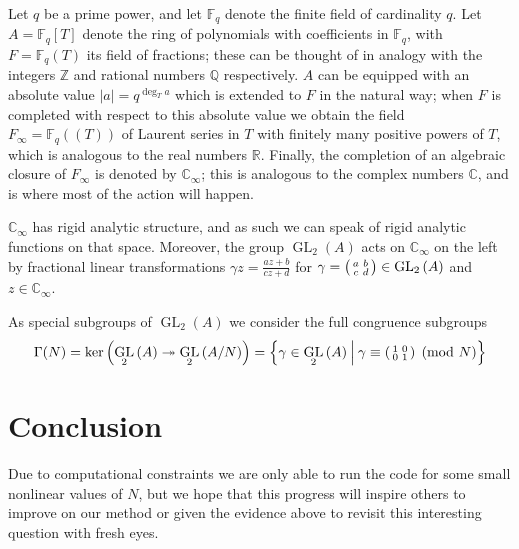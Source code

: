 \documentclass{article}
\newcommand*{\ZZ}{\mathbb{Z}}
\newcommand*{\QQ}{\mathbb{Q}}
\newcommand*{\RR}{\mathbb{R}}
\newcommand*{\CC}{\mathbb{C}}
\newcommand*{\CCi}{\mathbb{C}_\infty}
\newcommand*{\FF}{\mathbb{F}}
\newcommand*{\onto}{\twoheadrightarrow}
\DeclareMathOperator{\GLL}{GL}
\newcommand*{\GL}[2][]{\GLL_{#1}\parens{#2}}
\newcommand*{\setst}[2]{\left\{#1\:\middle|\:#2\right\}}
\newcommand*{\abs}[1]{\left\lvert#1\right\rvert}
\newcommand*{\parens}[1]{\left(#1\right)}
\begin{document}
Let $q$ be a prime power, and let $\FF_q$ denote the finite field of cardinality $q$.
Let $A = \FF_q[T]$ denote the ring of polynomials with coefficients in $\FF_q$, with $F = \FF_q(T)$ its field of fractions; these can be thought of in analogy with the integers $\ZZ$ and rational numbers $\QQ$ respectively.
$A$ can be equipped with an absolute value $\abs{a} = q^{\deg_T a}$ which is extended to $F$ in the natural way; when $F$ is completed with respect to this absolute value we obtain the field $F_\infty = \FF_q((T))$ of Laurent series in $T$ with finitely many positive powers of $T$, which is analogous to the real numbers $\RR$.
Finally, the completion of an algebraic closure of $F_\infty$ is denoted by $\CCi$; this is analogous to the complex numbers $\CC$, and is where most of the action will happen.

$\CCi$ has rigid analytic structure, and as such we can speak of rigid analytic functions on that space.
Moreover, the group $\GL[2]{A}$ acts on $\CCi$ on the left by fractional linear transformations $\gamma z = \frac{az+b}{cz+d}$ for $\gamma = \begin{psmallmatrix} a & b \\ c & d \end{psmallmatrix} \in \GL[2]{A}$ and $z \in \CCi$.

As special subgroups of $\GL[2]{A}$ we consider the full congruence subgroups
\[ \Gamma(N) = \ker\parens{\GL[2]{A} \onto \GL[2]{A/N}} = \setst{\gamma \in \GL[2]{A}}{\gamma \equiv \begin{psmallmatrix} 1 & 0 \\ 0 & 1 \end{psmallmatrix} \pmod{N}} \]

\section{Conclusion}

Due to computational constraints we are only able to run the code for some small nonlinear values of $N$, but we hope that this progress will inspire others to improve on our method or given the evidence above to revisit this interesting question with fresh eyes.
\end{document}
